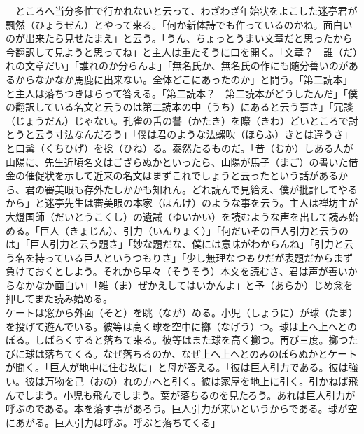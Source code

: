 　ところへ当分多忙で行かれないと云って、わざわざ年始状をよこした迷亭君が飄然（ひょうぜん）とやって来る。「何か新体詩でも作っているのかね。面白いのが出来たら見せたまえ」と云う。「うん、ちょっとうまい文章だと思ったから今翻訳して見ようと思ってね」と主人は重たそうに口を開く。「文章？　誰（だ）れの文章だい」「誰れのか分らんよ」「無名氏か、無名氏の作にも随分善いのがあるからなかなか馬鹿に出来ない。全体どこにあったのか」と問う。「第二読本」と主人は落ちつきはらって答える。「第二読本？　第二読本がどうしたんだ」「僕の翻訳している名文と云うのは第二読本の中（うち）にあると云う事さ」「冗談（じょうだん）じゃない。孔雀の舌の讐（かたき）を際（きわ）どいところで討とうと云う寸法なんだろう」「僕は君のような法螺吹（ほらふ）きとは違うさ」と口髯（くちひげ）を捻（ひね）る。泰然たるものだ。「昔（むか）しある人が山陽に、先生近頃名文はござらぬかといったら、山陽が馬子（まご）の書いた借金の催促状を示して近来の名文はまずこれでしょうと云ったという話があるから、君の審美眼も存外たしかかも知れん。どれ読んで見給え、僕が批評してやるから」と迷亭先生は審美眼の本家（ほんけ）のような事を云う。主人は禅坊主が大燈国師（だいとうこくし）の遺誡（ゆいかい）を読むような声を出して読み始める。「巨人（きょじん）、引力（いんりょく）」「何だいその巨人引力と云うのは」「巨人引力と云う題さ」「妙な題だな、僕には意味がわからんね」「引力と云う名を持っている巨人というつもりさ」「少し無理な\emph{つもり}だが表題だからまず負けておくとしよう。それから早々（そうそう）本文を読むさ、君は声が善いからなかなか面白い」「雑（ま）ぜかえしてはいかんよ」と予（あらか）じめ念を押してまた読み始める。\\

ケートは窓から外面（そと）を眺（なが）める。小児（しょうに）が球（たま）を投げて遊んでいる。彼等は高く球を空中に擲（なげう）つ。球は上へ上へとのぼる。しばらくすると落ちて来る。彼等はまた球を高く擲つ。再び三度。擲つたびに球は落ちてくる。なぜ落ちるのか、なぜ上へ上へとのみのぼらぬかとケートが聞く。「巨人が地中に住む故に」と母が答える。「彼は巨人引力である。彼は強い。彼は万物を己（おの）れの方へと引く。彼は家屋を地上に引く。引かねば飛んでしまう。小児も飛んでしまう。葉が落ちるのを見たろう。あれは巨人引力が呼ぶのである。本を落す事があろう。巨人引力が来いというからである。球が空にあがる。巨人引力は呼ぶ。呼ぶと落ちてくる」\\

